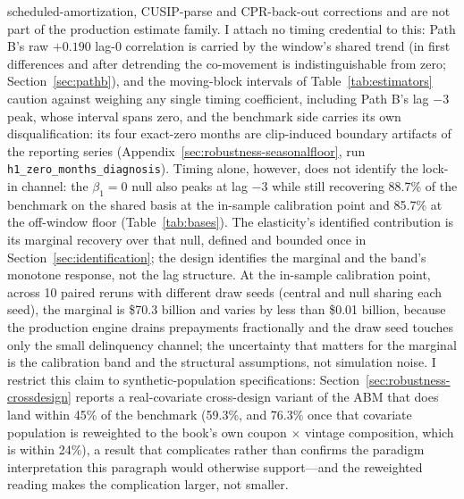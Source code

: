 \documentclass[12pt]{article}
\begin{document}
scheduled-amortization, CUSIP-parse and CPR-back-out corrections and are not part of the production estimate family. I attach no timing credential to this: Path B's raw $+0.190$ lag-0 correlation is carried by the window's shared trend (in first differences and after detrending the co-movement is indistinguishable from zero; Section~\ref{sec:pathb}), and the moving-block intervals of Table~\ref{tab:estimators} caution against weighing any single timing coefficient, including Path B's lag $-3$ peak, whose interval spans zero, and the benchmark side carries its own disqualification: its four exact-zero months are clip-induced boundary artifacts of the reporting series (Appendix~\ref{sec:robustness-seasonalfloor}, run \texttt{h1\_zero\_months\_diagnosis}). Timing alone, however, does not identify the lock-in channel: the $\beta_1 = 0$ null also peaks at lag $-3$ while still recovering 88.7\% of the benchmark on the shared basis at the in-sample calibration point and 85.7\% at the off-window floor (Table~\ref{tab:bases}). The elasticity's identified contribution is its marginal recovery over that null, defined and bounded once in Section~\ref{sec:identification}; the design identifies the marginal and the band's monotone response, not the lag structure. At the in-sample calibration point, across 10 paired reruns with different draw seeds (central and null sharing each seed), the marginal is \$70.3 billion and varies by less than \$0.01 billion, because the production engine drains prepayments fractionally and the draw seed touches only the small delinquency channel; the uncertainty that matters for the marginal is the calibration band and the structural assumptions, not simulation noise. I restrict this claim to synthetic-population specifications: Section~\ref{sec:robustness-crossdesign} reports a real-covariate cross-design variant of the ABM that does land within 45\% of the benchmark (59.3\%, and 76.3\% once that covariate population is reweighted to the book's own coupon $\times$ vintage composition, which is within 24\%), a result that complicates rather than confirms the paradigm interpretation this paragraph would otherwise support---and the reweighted reading makes the complication larger, not smaller.
\end{document}
